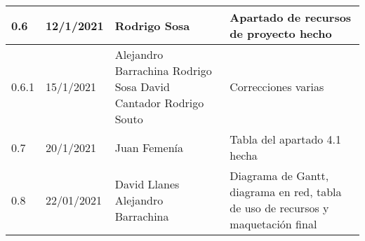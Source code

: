 \documentclass[12pt]{article}
\begin{document}
\begin{tabularx}{\textwidth}{ |l|l|p{5cm}|X| }
	\hline
	0.6                    & 12/1/2021                                                                        & Rodrigo Sosa                  & Apartado de recursos de proyecto hecho                                          \\
	\hline
	0.6.1                  & 15/1/2021                                                                        & Alejandro Barrachina \newline
	Rodrigo Sosa \newline
	David Cantador \newline
	Rodrigo Souto \newline & Correcciones varias                                                                                                                                                                                \\
	\hline
	0.7                    & 20/1/2021                                                                        & Juan Femenía                  & Tabla del apartado 4.1 hecha                                                    \\
	\hline
	0.8                    & 22/01/2021                                                                       & David Llanes \newline
	Alejandro Barrachina   & Diagrama de Gantt, diagrama en red, tabla de uso de recursos y maquetación final                                                                                                                   \\
	\hline
\end{tabularx}

\newpage
\tableofcontents
\newpage

\newpage

\newpage

\newpage

\newpage

\newpage

\newpage

\newpage
\printglossary[title=Apendice A. Glosario]
\newpage
{}
\end{document}
